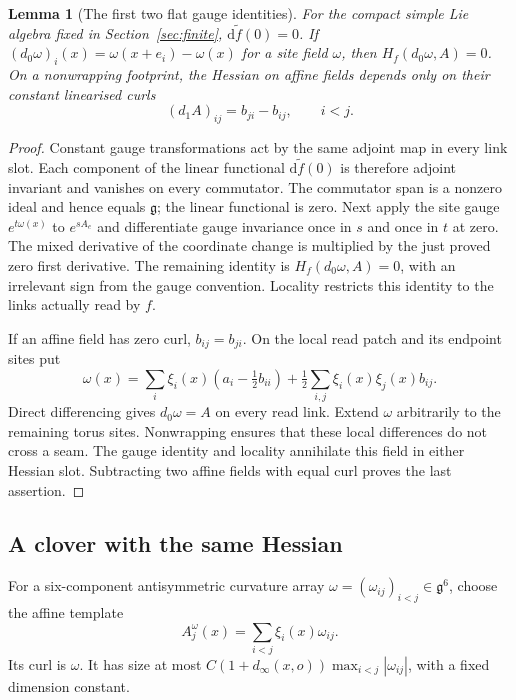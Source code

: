 \documentclass[11pt,reqno]{amsart}
\numberwithin{equation}{section}
\newtheorem{lemma}[theorem]{Lemma}
\theoremstyle{definition}
\theoremstyle{remark}
\newcommand{\dd}{\mathrm d}
\newcommand{\g}{\mathfrak g}
\begin{document}
\begin{lemma}[The first two flat gauge identities]
\label{lem:reset-flat-gauge-identities}
For the compact simple Lie algebra fixed in Section~\ref{sec:finite},
\(\dd\widetilde f(0)=0\). If
\((d_0\omega)_i(x)=\omega(x+e_i)-\omega(x)\) for a site field
\(\omega\), then \(H_f(d_0\omega,A)=0\). On a nonwrapping
footprint, the Hessian on affine fields depends only on their
constant linearised curls
\begin{equation}
                (d_1A)_{ij}=b_{ji}-b_{ij},\qquad i<j.
 \label{eq:reset-affine-curl}
\end{equation}
\end{lemma}
\begin{proof}
Constant gauge transformations act by the same adjoint map
in every link slot. Each component of the linear functional
\(\dd\widetilde f(0)\) is therefore adjoint invariant and
vanishes on every commutator. The commutator span is a
nonzero ideal and hence equals \(\g\); the linear functional
is zero. Next apply the site gauge \(e^{t\omega(x)}\) to
\(e^{sA_e}\) and differentiate gauge invariance once in
\(s\) and once in \(t\) at zero. The mixed derivative of
the coordinate change is multiplied by the just proved
zero first derivative. The remaining identity is
\(H_f(d_0\omega,A)=0\), with an irrelevant sign from the
gauge convention. Locality restricts this identity to the
links actually read by \(f\).

If an affine field has zero curl, \(b_{ij}=b_{ji}\). On the
local read patch and its endpoint sites put
\[
 \omega(x)=\sum_i\xi_i(x)(a_i-\tfrac12b_{ii})
                  +\tfrac12\sum_{i,j}\xi_i(x)\xi_j(x)b_{ij}.
\]
Direct differencing gives \(d_0\omega=A\) on every read
link. Extend \(\omega\) arbitrarily to the remaining torus
sites. Nonwrapping ensures that these local differences
do not cross a seam. The gauge identity and locality
annihilate this field in either Hessian slot. Subtracting
two affine fields with equal curl proves the last assertion.
\end{proof}

\subsection{A clover with the same Hessian}

For a six-component antisymmetric curvature array
\(\omega=(\omega_{ij})_{i<j}\in\g^6\), choose the affine
template
\[
             A^\omega_j(x)=\sum_{i<j}\xi_i(x)\omega_{ij}.
\]
Its curl is \(\omega\). It has size at most
\(C(1+d_\infty(x,o))\max_{i<j}|\omega_{ij}|\), with a
fixed dimension constant.
\end{document}
